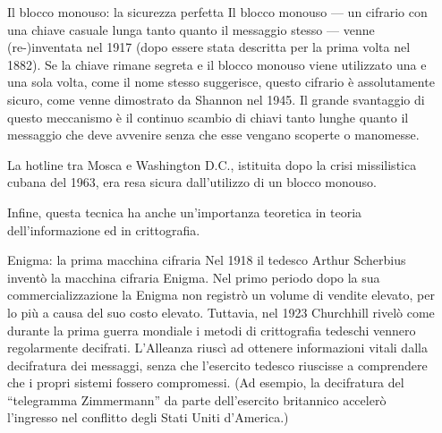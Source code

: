 \documentclass[final,hyperref={pdfpagelabels=false}]{beamer}
\begin{document}
\begin{frame}{}
\begin{columns}[t]
\begin{column}{.3\linewidth}
    \end{column}
    \begin{column}{.3\linewidth}
        \begin{block}{Il blocco monouso: la sicurezza perfetta}
          Il blocco monouso --- un cifrario con una chiave casuale lunga tanto quanto il messaggio stesso --- venne (re-)inventata nel 1917 (dopo essere stata descritta per la prima volta nel 1882). Se la chiave rimane segreta e il blocco monouso viene utilizzato una e una sola volta, come il nome stesso suggerisce, questo cifrario è assolutamente sicuro, come venne dimostrato da Shannon nel 1945. Il grande svantaggio di questo meccanismo è il continuo scambio di chiavi tanto lunghe quanto il messaggio che deve avvenire senza che esse vengano scoperte o manomesse. \par
          La hotline tra Mosca e Washington D.C., istituita dopo la crisi missilistica cubana del 1963, era resa sicura dall'utilizzo di un blocco monouso. \par
          Infine, questa tecnica ha anche un'importanza teoretica in teoria dell'informazione ed in crittografia.
        \end{block}
        \begin{block}{Enigma: la prima macchina cifraria}
          Nel 1918 il tedesco Arthur Scherbius inventò la macchina cifraria Enigma. Nel primo periodo dopo la sua commercializzazione la Enigma non registrò un volume di vendite elevato, per lo più a causa del suo costo elevato. Tuttavia, nel 1923 Churchhill rivelò come durante la prima guerra mondiale i metodi di crittografia tedeschi vennero regolarmente decifrati. L'Alleanza riuscì ad ottenere informazioni vitali dalla decifratura dei messaggi, senza che l'esercito tedesco riuscisse a comprendere che i propri sistemi fossero compromessi. (Ad esempio, la decifratura del ``telegramma Zimmermann'' da parte dell'esercito britannico accelerò l'ingresso nel conflitto degli Stati Uniti d'America.) \par

\end{block}
\end{column}
\end{columns}
\end{frame}
\end{document}
